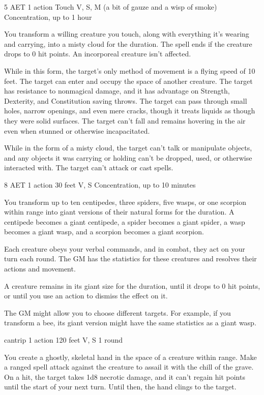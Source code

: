 {5 AET}
{1 action}
{Touch}
{V, S, M (a bit of gauze and a wisp of smoke)}
{Concentration, up to 1 hour}

You transform a willing creature you touch, along with everything it's wearing and carrying, into a misty cloud for the duration. The spell ends if the creature drops to 0 hit points. An incorporeal creature isn't affected.

While in this form, the target's only method of movement is a flying speed of 10 feet. The target can enter and occupy the space of another creature. The target has resistance to nonmagical damage, and it has advantage on Strength, Dexterity, and Constitution saving throws. The target can pass through small holes, narrow openings, and even mere cracks, though it treats liquids as though they were solid surfaces. The target can't fall and remains hovering in the air even when stunned or otherwise incapacitated.

While in the form of a misty cloud, the target can't talk or manipulate objects, and any objects it was carrying or holding can't be dropped, used, or otherwise interacted with. The target can't attack or cast spells.


{8 AET}
{1 action}
{30 feet}
{V, S}
{Concentration, up to 10 minutes}

You transform up to ten centipedes, three spiders, five wasps, or one scorpion within range into giant versions of their natural forms for the duration. A centipede becomes a giant centipede, a spider becomes a giant spider, a wasp becomes a giant wasp, and a scorpion becomes a giant scorpion.

Each creature obeys your verbal commands, and in combat, they act on your turn each round. The GM has the statistics for these creatures and resolves their actions and movement.

A creature remains in its giant size for the duration, until it drops to 0 hit points, or until you use an action to dismiss the effect on it.

The GM might allow you to choose different targets. For example, if you transform a bee, its giant version might have the same statistics as a giant wasp.


{cantrip}
{1 action}
{120 feet}
{V, S}
{1 round}

You create a ghostly, skeletal hand in the space of a creature within range. Make a ranged spell attack against the creature to assail it with the chill of the grave. On a hit, the target takes 1d8 necrotic damage, and it can't regain hit points until the start of your next turn. Until then, the hand clings to the target.

